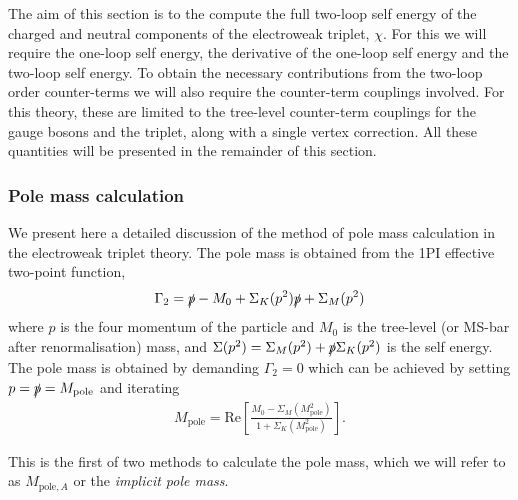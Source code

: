\documentclass[11pt]{article}
\def\Mp{M_{\text{pole}}}
\def\Mpa{M_{\text{pole},A}}
\begin{document}
The aim of this section is to the compute the full two-loop self energy of the charged and neutral components of the electroweak triplet, $\chi$.  For this we will require the one-loop self energy, the derivative of the one-loop self energy and the two-loop self energy.  To obtain the necessary contributions from the two-loop order counter-terms we will also require the counter-term couplings involved.  For this theory, these are limited to the tree-level counter-term couplings for the gauge bosons and the triplet, along with a single vertex correction.  All these quantities will be presented in the remainder of this section.


\subsubsection{Pole mass calculation}

We present here a detailed discussion of the method of pole mass calculation in the electroweak triplet theory.  The pole mass is obtained from the 1PI effective two-point function,
\begin{equation}
\Gamma_2=\slashed{p}-M_0+\Sigma_K(p^2)\slashed{p}+\Sigma_M(p^2) \label{eqn:propagator}
\end{equation}
where $p$ is the four momentum of the particle and $M_0$ is the tree-level (or MS-bar after renormalisation) mass, and $\Sigma(p^2)=\Sigma_M(p^2)+\slashed{p}\Sigma_K(p^2)$ is the self energy.  The pole mass is obtained by demanding $\Gamma_2=0$ which can be achieved by setting $p=\slashed{p}=\Mp$ and iterating
\begin{align}
\Mp=\text{Re}\left[\frac{M_0-\Sigma_M(\Mp^2)}{1+\Sigma_K(\Mp^2)}\right]. \label{eqn:M_pole_iterative}
\end{align}

This is the first of two methods to calculate the pole mass, which we will refer to as $\Mpa$ or the \textit{implicit pole mass}.\\
\end{document}

